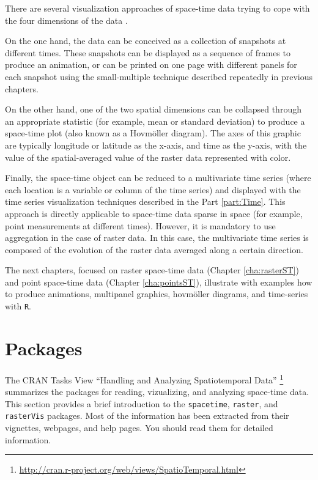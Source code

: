 \documentclass[smallroyalvopaper]{memoir}
\begin{document}
There are several visualization approaches of space-time data trying to cope with the four dimensions of the data \cite{Cressie.Wikle2011}.

On the one hand, the data can be conceived as a collection of snapshots at different times. These snapshots can be displayed as a sequence of frames to produce an animation, or can be printed on one page with different panels for each snapshot using the small-multiple technique described repeatedly in previous chapters.

On the other hand, one of the two spatial dimensions can be collapsed through an appropriate statistic (for example, mean or standard deviation) to produce a space-time plot (also known as a Hovmöller diagram). The axes of this graphic are typically longitude or latitude as the x-axis, and time as the y-axis, with the value of the spatial-averaged value of the raster data represented with color.

Finally, the space-time object can be reduced to a multivariate time series (where each location is a variable or column of the time series) and displayed with the time series visualization techniques described in the Part \ref{part:Time}. This approach is directly applicable to space-time data sparse in space (for example, point measurements at different times). However, it is mandatory to use aggregation in the case of raster data. In this case, the multivariate time series is composed of the evolution of the raster data averaged along a certain direction.

The next chapters, focused on raster space-time data (Chapter \ref{cha:rasterST}) and point space-time data (Chapter \ref{cha:pointsST}), illustrate with examples how to produce animations, multipanel graphics, hovmöller diagrams, and time-series with \texttt{R}.

\section{Packages}
\label{sec:orgheadline41}
\label{sec:spacetime-packages}

The CRAN Tasks View ``Handling and Analyzing Spatiotemporal Data'' \footnote{\url{http://cran.r-project.org/web/views/SpatioTemporal.html}} summarizes the packages for reading, vizualizing, and analyzing space-time data. This section provides a brief introduction to the \texttt{spacetime}, \texttt{raster}, and \texttt{rasterVis} packages. Most of the information has been extracted from their vignettes, webpages, and help pages. You should read them for detailed information.
\end{document}
